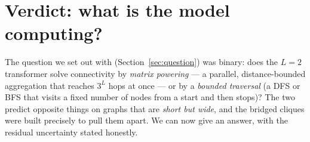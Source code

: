 \documentclass[11pt,a4paper]{article}
\begin{document}
\section{Verdict: what is the model computing?}
\label{sec:verdict}
The question we set out with (Section~\ref{sec:question}) was binary: does the $L=2$ transformer
solve connectivity by \emph{matrix powering} --- a parallel, distance-bounded aggregation that
reaches $3^L$ hops at once --- or by a \emph{bounded traversal} (a DFS or BFS that visits a fixed
number of nodes from a start and then stops)? The two predict opposite things on graphs that are
\emph{short but wide}, and the bridged cliques were built precisely to pull them apart. We can now
give an answer, with the residual uncertainty stated honestly.
\end{document}
